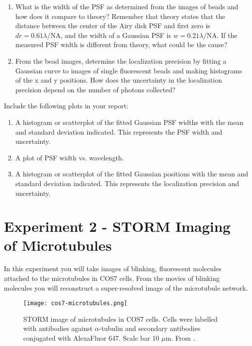 \documentclass[10pt,a4paper,oneside]{book}
\begin{document}
\begin{enumerate}
    \item What is the width of the PSF as determined from the images of beads and how does it compare to theory? Remember that theory states that the distance between the center of the Airy disk PSF and first zero is $dr = 0.61 \lambda / \text{NA}$, and the width of a Gaussian PSF is $w = 0.21 \lambda / \text{NA}$. If the measured PSF width is different from theory, what could be the cause?
    \item From the bead images, determine the localization precision by fitting a Gaussian curve to images of single fluorescent beads and making histograms of the x and y positions. How does the uncertainty in the localization precision depend on the number of photons collected?
\end{enumerate}

Include the following plots in your report:

\begin{enumerate}
    \item A histogram or scatterplot of the fitted Gaussian PSF widths with the mean and standard deviation indicated. This represents the PSF width and uncertainty.
    \item A plot of PSF width vs. wavelength.
    \item A histogram or scatterplot of the fitted Gaussian positions with the mean and standard deviation indicated. This represents the localization precision and uncertainty.
\end{enumerate}

\section{Experiment 2 - STORM Imaging of Microtubules}\label{sec:exp2}

In this experiment you will take images of blinking, fluorescent molecules attached to the microtubules in COS7 cells. From the movies of blinking molecules you will reconstruct a super-resolved image of the microtubule network.

\begin{figure}[ht]
    \centering
    \texttt{[image: cos7-microtubules.png]}
    \caption{STORM image of microtubules in COS7 cells. Cells were labelled with antibodies against $\alpha$-tubulin and secondary antibodies conjugated with AlexaFluor 647. Scale bar 10 $\mu$m. From \cite{douglass-naturephotonics-2016}.}
    \label{fig:cos7-microtubules}
\end{figure}
\end{document}
